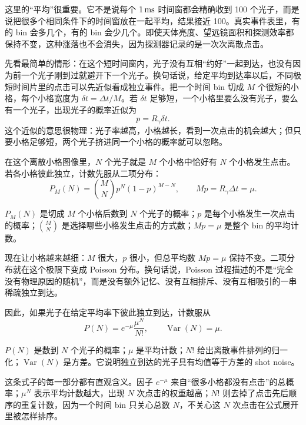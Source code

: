 这里的“平均”很重要。它不是说每个 \(1\,{\rm ms}\) 时间窗都会精确收到 100 个光子，而是说把很多个相同条件下的时间窗放在一起平均，结果接近 100。真实事件表里，有的 bin 会多几个，有的 bin 会少几个。即使天体亮度、望远镜面积和探测效率都保持不变，这种涨落也不会消失，因为探测器记录的是一次次离散点击。

先看最简单的情形：在这个短时间窗内，光子没有互相“约好”一起到达，也没有因为前一个光子刚到过就避开下一个光子。换句话说，给定平均到达率以后，不同极短时间片里的点击可以先近似看成独立事件。把一个时间 bin 切成 \(M\) 个很短的小格，每个小格宽度为 \(\delta t=\Delta t/M\)。若 \(\delta t\) 足够短，一个小格里要么没有光子，要么有一个光子，出现光子的概率近似为
\[
  p=R_\gamma\delta t .
\]
这个近似的意思很物理：光子率越高，小格越长，看到一次点击的机会越大；但只要小格足够短，两个光子挤进同一个小格的概率就可以忽略。

在这个离散小格图像里，\(N\) 个光子就是 \(M\) 个小格中恰好有 \(N\) 个小格发生点击。若各小格彼此独立，计数先服从二项分布：
\begin{equation}
  P_M(N)=\binom{M}{N}p^N(1-p)^{M-N},
  \qquad Mp=R_\gamma\Delta t=\mu .
  \label{eq:poisson-from-binomial}
\end{equation}
\begin{formulaexplain}
\(P_M(N)\) 是切成 \(M\) 个小格后数到 \(N\) 个光子的概率；\(p\) 是每个小格发生一次点击的概率；\(\binom{M}{N}\) 是选择哪些小格发生点击的方式数；\(Mp=\mu\) 是整个 bin 的平均计数。
\end{formulaexplain}
现在让小格越来越细：\(M\) 很大，\(p\) 很小，但总平均数 \(Mp=\mu\) 保持不变。二项分布就在这个极限下变成 Poisson 分布。换句话说，Poisson 过程描述的不是“完全没有物理原因的随机”，而是没有额外记忆、没有互相排斥、没有互相吸引的一串稀疏独立到达。

因此，如果光子在给定平均率下彼此独立到达，计数服从
\begin{equation}
  P(N)=e^{-\mu}\frac{\mu^N}{N!},
  \qquad
  \operatorname{Var}(N)=\mu .
  \label{eq:poisson}
\end{equation}
\begin{formulaexplain}
\(P(N)\) 是数到 \(N\) 个光子的概率；\(\mu\) 是平均计数；\(N!\) 给出离散事件排列的归一化；\(\operatorname{Var}(N)\) 是方差。它说明独立到达的光子具有均值等于方差的 shot noise。
\end{formulaexplain}
这条式子的每一部分都有直观含义。因子 \(e^{-\mu}\) 来自“很多小格都没有点击”的总概率；\(\mu^N\) 表示平均计数越大，出现 \(N\) 次点击的权重越高；\(N!\) 则去掉了点击先后顺序的重复计数，因为一个时间 bin 只关心总数 \(N\)，不关心这 \(N\) 次点击在公式展开里被怎样排序。

